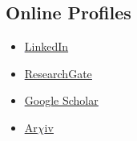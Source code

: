 \documentclass[11pt,a4paper,sans]{moderncv}        %
\begin{document}
\vspace{5pt}

\subsection{Online Profiles}

\vspace{5pt}

\begin{itemize}
\item{\textcolor{blue}{\underline{\href{http://linkedin.com/in/lachlan-marnham-a463b190}{LinkedIn}}}}

\vspace{6pt}

\item{\textcolor{blue}{\underline{\href{https://www.researchgate.net/profile/Lachlan_Marnham}{ResearchGate}}}}

\vspace{6pt}

\item{\textcolor{blue}{\underline{\href{https://scholar.google.co.uk/citations?user=5Vi60LYAAAAJ&hl=en}{Google Scholar}}}}

\vspace{6pt}

\item{\textcolor{blue}{\underline{\href{http://arxiv.org/a/marnham_l_1.html}{Ar$\chi$iv}}}}
\end{itemize}




\end{document}
